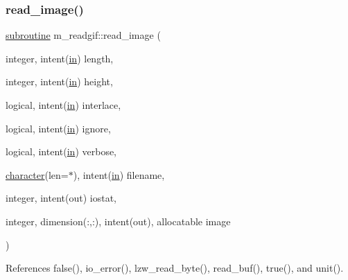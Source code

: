 \subsubsection{\texorpdfstring{read\+\_\+image()}{read\_image()}}
{\footnotesize\ttfamily \hyperlink{M__stopwatch_83_8txt_acfbcff50169d691ff02d4a123ed70482}{subroutine} m\+\_\+readgif\+::read\+\_\+image (\begin{DoxyParamCaption}\item[{integer, intent(\hyperlink{M__journal_83_8txt_afce72651d1eed785a2132bee863b2f38}{in})}]{length,  }\item[{integer, intent(\hyperlink{M__journal_83_8txt_afce72651d1eed785a2132bee863b2f38}{in})}]{height,  }\item[{logical, intent(\hyperlink{M__journal_83_8txt_afce72651d1eed785a2132bee863b2f38}{in})}]{interlace,  }\item[{logical, intent(\hyperlink{M__journal_83_8txt_afce72651d1eed785a2132bee863b2f38}{in})}]{ignore,  }\item[{logical, intent(\hyperlink{M__journal_83_8txt_afce72651d1eed785a2132bee863b2f38}{in})}]{verbose,  }\item[{\hyperlink{option__stopwatch_83_8txt_abd4b21fbbd175834027b5224bfe97e66}{character}(len=$\ast$), intent(\hyperlink{M__journal_83_8txt_afce72651d1eed785a2132bee863b2f38}{in})}]{filename,  }\item[{integer, intent(out)}]{iostat,  }\item[{integer, dimension(\+:,\+:), intent(out), allocatable}]{image }\end{DoxyParamCaption})\hspace{0.3cm}{\ttfamily [private]}}



References false(), io\+\_\+error(), lzw\+\_\+read\+\_\+byte(), read\+\_\+buf(), true(), and unit().

\mbox{\label{namespacem__readgif_a775e2da2a9f54ec308e87a339a393ed6}} 
